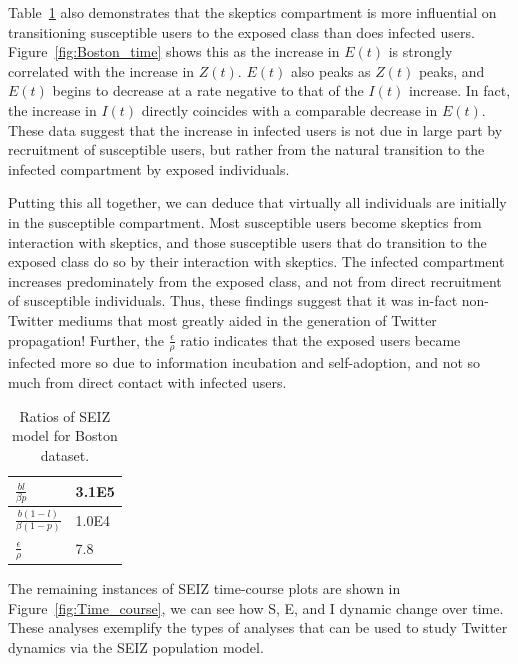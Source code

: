 Table~\ref{tab:seiz_boston_bombing} also demonstrates that the skeptics compartment is more influential on transitioning susceptible users to the exposed class than does infected users. Figure~\ref{fig:Boston_time} shows this as the increase in $E(t)$ is strongly correlated with the increase in $Z(t)$. $E(t)$ also peaks as $Z(t)$ peaks, and $E(t)$ begins to decrease at a rate negative to that of the $I(t)$ increase. In fact, the increase in $I(t)$ directly coincides with a comparable decrease in $E(t)$. These data suggest that the increase in infected users is not due in large part by recruitment of susceptible users, but rather from the natural transition to the infected compartment by exposed individuals.

Putting this all together, we can deduce that virtually all individuals are initially in the susceptible compartment. Most susceptible users become skeptics from interaction with skeptics, and those susceptible users that do transition to the exposed class do so by their interaction with skeptics. The infected compartment increases predominately from the exposed class, and not from direct recruitment of susceptible individuals. Thus, these findings suggest that it was in-fact non-Twitter mediums that most greatly aided in the generation of Twitter propagation! Further, the $\frac{\epsilon}{\rho}$ ratio indicates that the exposed users became infected more so due to information incubation and self-adoption, and not so much from direct contact with infected users.

\begin{table}
\renewcommand{\arraystretch}{2.5}
\small
\centering
\caption{Ratios of SEIZ model for Boston dataset.}
\vspace{0.5em}
\begin{tabular}{|p{2.5cm} |  p{1.5cm}|} \hline
$\displaystyle \frac{bl}{\beta p}$ & 3.1E5\\ \hline
$\displaystyle \frac{b(1-l)}{\beta (1-p)}$ & 1.0E4 \\ \hline
$\displaystyle \frac{\epsilon}{\rho}$ & 7.8\\
\hline\end{tabular}
\label{tab:seiz_boston_bombing}
\end{table}

The remaining instances of SEIZ time-course plots are shown in Figure~\ref{fig:Time_course}, we can see how S, E, and I dynamic change over time. These analyses exemplify the types of analyses that can be used to study Twitter dynamics via the SEIZ population model.

